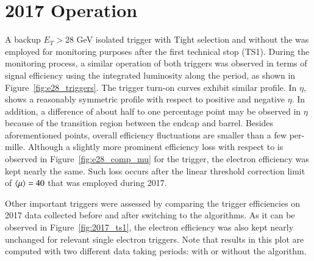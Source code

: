 \section{2017 Operation}\label{ssec:2017_ringer_operation}


A backup $E_T > 28$ GeV isolated trigger with Tight selection and without the \rnn{} was employed for
monitoring purposes after the first technical stop (TS1). During the monitoring process, a similar
operation of both triggers was observed in terms of signal efficiency using the
integrated luminosity along the period, as shown in
Figure~\ref{fig:e28_triggers}. The trigger
turn-on curves exhibit similar profile. In $\eta$, \rnn{} shows a reasonably symmetric
profile with respect to positive and negative $\eta$. In addition, a difference of about half to one percentage point may be observed in $\eta$ because of the transition region between the endcap and barrel. Besides
aforementioned points, overall efficiency fluctuations are smaller than a few
per-mille. Although a slightly more prominent efficiency loss with respect to
\avgmu{} is observed in Figure~\ref{fig:e28_comp_mu} for the \rnn{} trigger, the
electron efficiency was kept nearly the same. Such loss occurs after the
linear threshold correction limit of $\langle \mu \rangle=40$ that was employed during 2017.

Other important triggers were assessed by comparing the trigger efficiencies on
2017 data collected before and after switching to the \rnn{} algorithms.  As it can be observed in Figure~\ref{fig:2017_ts1}, the electron efficiency was also kept nearly unchanged for relevant single electron triggers. Note that results in
this plot are computed with two different data taking periods: with or
without the \rnn{} algorithm. %




